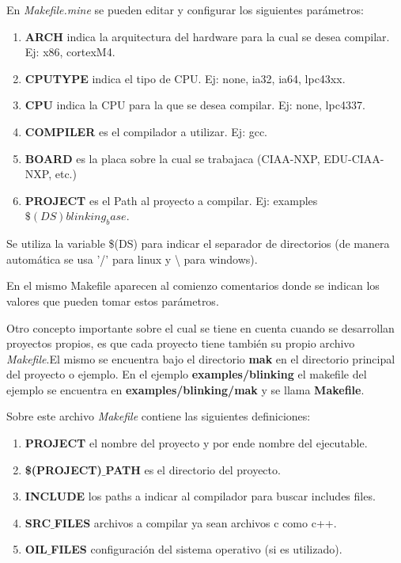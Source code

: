 \documentclass[12pt,letterpaper]{article}
\begin{document}
En \textit{Makefile.mine} se pueden editar y configurar los siguientes parámetros\cite{parametrosdelmakefile}:
\begin{enumerate}
\item \textbf{ARCH}  indica la arquitectura del hardware para la cual se desea compilar. Ej: x86, cortexM4.
\item \textbf{CPUTYPE} indica el tipo de CPU. Ej: none, ia32, ia64, lpc43xx.
\item \textbf{CPU} indica la CPU para la que se desea compilar. Ej: none, lpc4337.
\item \textbf{COMPILER }es el compilador a utilizar. Ej: gcc.
\item \textbf{BOARD }es la placa sobre la cual se trabajaca (CIAA-NXP, EDU-CIAA-NXP, etc.)
\item \textbf{PROJECT }es el Path al proyecto a compilar. Ej: examples$\$(DS)blinking_base$.
\end{enumerate}
Se utiliza la variable \$(DS) para indicar el separador de directorios (de manera automática se usa '/' para linux y \textbackslash{} para windows).

En el mismo Makefile aparecen al comienzo comentarios donde se indican los valores que pueden tomar estos parámetros.

Otro concepto importante sobre el cual se tiene en cuenta cuando se desarrollan proyectos propios, es que cada proyecto tiene también su propio archivo \textit{Makefile}.El mismo se encuentra bajo el directorio \textbf{mak} en el directorio principal del proyecto o ejemplo. En el ejemplo \textbf{examples/blinking} el makefile del ejemplo se encuentra en \textbf{examples/blinking/mak} y se llama \textbf{Makefile}.

Sobre este archivo \textit{Makefile} contiene las siguientes definiciones:

\begin{enumerate}
\item \textbf{PROJECT} el nombre del proyecto y por ende nombre del ejecutable.
\item \textbf{\$(PROJECT)$\_$PATH} es el directorio del proyecto.
\item \textbf{INCLUDE} los paths a indicar al compilador para buscar includes files.
\item \textbf{SRC$\_$FILES} archivos a compilar ya sean archivos c como c++.
\item \textbf{OIL$\_$FILES} configuración del sistema operativo (si es utilizado).
\end{enumerate}
\end{document}
